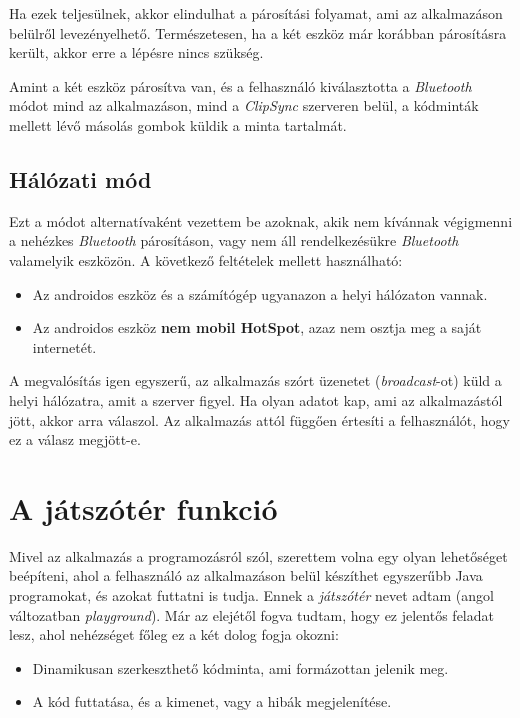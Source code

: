 \documentclass[12pt,a4paper]{article}
\begin{document}
	Ha ezek teljesülnek, akkor elindulhat a párosítási folyamat, ami az alkalmazáson belülről levezényelhető. Természetesen, ha a két eszköz már korábban párosításra 
	került, akkor erre a lépésre nincs szükség.
	
	Amint a két eszköz párosítva van, és a felhasználó kiválasztotta a \textit{Bluetooth} módot mind az alkalmazáson, mind a \textit{ClipSync} szerveren belül, a kódminták mellett lévő másolás gombok küldik a minta tartalmát.
	
	\subsection{Hálózati mód}
	
	Ezt a módot alternatívaként vezettem be azoknak, akik nem kívánnak végigmenni a nehézkes \textit{Bluetooth} párosításon, vagy nem áll rendelkezésükre \textit{Bluetooth} valamelyik eszközön. A következő feltételek mellett használható:
	
	\begin{itemize}
		\item Az androidos eszköz és a számítógép ugyanazon a helyi hálózaton vannak.
		\item Az androidos eszköz \textbf{nem mobil HotSpot}, azaz nem osztja meg a saját internetét.
	\end{itemize}

	A megvalósítás igen egyszerű, az alkalmazás szórt üzenetet (\textit{broadcast}-ot) küld a helyi hálózatra, amit a szerver figyel. Ha olyan adatot kap, ami az alkalmazástól jött, akkor arra válaszol. Az alkalmazás attól függően értesíti a felhasználót, hogy ez a válasz megjött-e.  
	
	\section{A játszótér funkció}\label{playground}

	Mivel az alkalmazás a programozásról szól, szerettem volna egy olyan lehetőséget beépíteni, ahol a felhasználó az alkalmazáson belül készíthet egyszerűbb Java programokat, és azokat futtatni is tudja. Ennek a \textit{játszótér} nevet adtam (angol változatban \textit{playground}). Már az elejétől fogva tudtam, hogy ez jelentős feladat lesz, ahol nehézséget főleg ez a két dolog fogja okozni:
	
	\begin{itemize}
		\item Dinamikusan szerkeszthető kódminta, ami formázottan jelenik meg.
		\item A kód futtatása, és a kimenet, vagy a hibák megjelenítése.
	\end{itemize}
\end{document}
